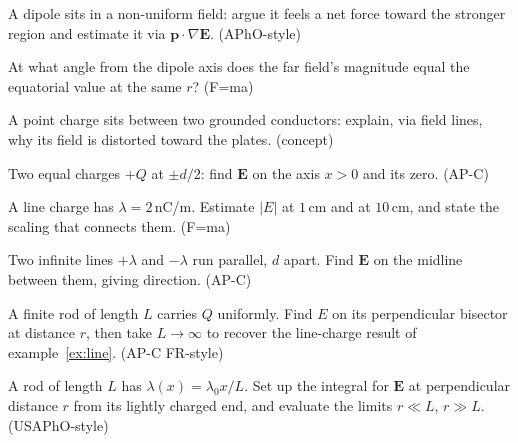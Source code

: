\begin{exercise}[hard]
A dipole sits in a non-uniform field: argue it feels a net force toward
the stronger region and estimate it via $\mathbf p\cdot\nabla\mathbf E$.
(APhO-style)
\end{exercise}
\begin{exercise}[medium]
At what angle from the dipole axis does the far field's magnitude equal
the equatorial value at the same $r$? (F=ma)
\end{exercise}
\begin{exercise}[medium]
A point charge sits between two grounded conductors: explain, via field
lines, why its field is distorted toward the plates. (concept)
\end{exercise}
\begin{exercise}[medium]
Two equal charges $+Q$ at $\pm d/2$: find $\mathbf E$ on the axis
$x>0$ and its zero. (AP-C)
\end{exercise}
\begin{exercise}[easy]
A line charge has $\lambda=2$\,nC/m. Estimate $|E|$ at $1$\,cm and
at $10$\,cm, and state the scaling that connects them. (F=ma)
\end{exercise}
\begin{exercise}[medium]
Two infinite lines $+\lambda$ and $-\lambda$ run parallel, $d$ apart.
Find $\mathbf E$ on the midline between them, giving direction. (AP-C)
\end{exercise}
\begin{exercise}[medium]
A finite rod of length $L$ carries $Q$ uniformly. Find $E$ on its
perpendicular bisector at distance $r$, then take $L\to\infty$ to
recover the line-charge result of example~\ref{ex:line}. (AP-C
FR-style)
\end{exercise}
\begin{exercise}[hard]
A rod of length $L$ has $\lambda(x)=\lambda_0 x/L$. Set up the
integral for $\mathbf E$ at perpendicular distance $r$ from its
lightly charged end, and evaluate the limits $r\ll L$, $r\gg L$.
(USAPhO-style)
\end{exercise}
